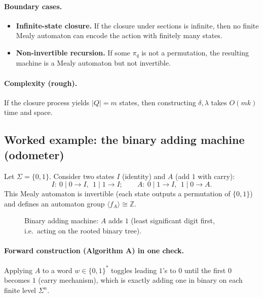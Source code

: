 \documentclass[11pt]{article}
\theoremstyle{definition}
\theoremstyle{plain}
\theoremstyle{remark}
\begin{document}
\paragraph{Boundary cases.}
\begin{itemize}[leftmargin=2em]
\item \textbf{Infinite-state closure.} If the closure under sections is infinite, then no finite Mealy automaton can encode the action with finitely many states.
\item \textbf{Non-invertible recursion.} If some $\pi_q$ is not a permutation, the resulting machine is a Mealy automaton but not invertible.
\end{itemize}

\paragraph{Complexity (rough).}
If the closure process yields $|Q|=m$ states, then constructing $\delta,\lambda$ takes $O(mk)$ time and space.

\subsection*{Worked example: the binary adding machine (odometer)}
Let $\Sigma=\{0,1\}$. Consider two states $I$ (identity) and $A$ (add $1$ with carry):
\[
I:\ 0\mid 0\to I,\ \ 1\mid 1\to I;\qquad
A:\ 0\mid 1\to I,\ \ 1\mid 0\to A.
\]
This Mealy automaton is invertible (each state outputs a permutation of $\{0,1\}$) and defines an automaton group
$\langle f_A\rangle\cong \mathbb Z$.

\begin{figure}[h]
\centering
{}
\caption{Binary adding machine: $A$ adds $1$ (least significant digit first, i.e.\ acting on the rooted binary tree).}
\end{figure}

\paragraph{Forward construction (Algorithm A) in one check.}
Applying $A$ to a word $w\in\{0,1\}^*$ toggles leading $1$'s to $0$ until the first $0$ becomes $1$ (carry mechanism),
which is exactly adding one in binary on each finite level $\Sigma^n$.
\end{document}
